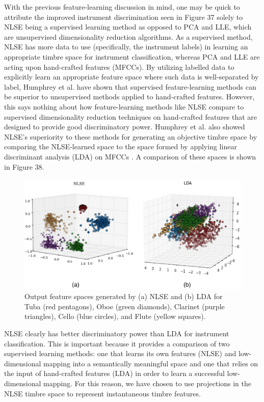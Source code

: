 \documentclass[12pt]{report} 	%
\numberwithin{figure}{chapter}
\numberwithin{table}{chapter}
\numberwithin{equation}{chapter}
\begin{document}
\begin{flushleft}
With the previous feature-learning discussion in mind, one may be quick to attribute the improved instrument discrimination seen in Figure 37 solely to NLSE being a supervised learning method as opposed to PCA and LLE, which are unsupervised dimensionality reduction algorithms. As a supervised method, NLSE has more data to use (specifically, the instrument labels) in learning an appropriate timbre space for instrument classification, whereas PCA and LLE are acting upon hand-crafted features (MFCCs). By utilizing labelled data to explicitly learn an appropriate feature space where such data is well-separated by label, Humphrey et al. have shown that supervised feature-learning methods can be superior to unsupervised methods applied to hand-crafted features. However, this says nothing about how feature-learning methods like NLSE compare to supervised dimensionality reduction techniques on hand-crafted features that are designed to provide good discriminatory power. Humphrey et al. also showed NLSE's superiority to these methods for generating an objective timbre space by comparing the NLSE-learned space to the space formed by applying linear discriminant analysis (LDA) on MFCCs \cite{humphrey2013feature}. A comparison of these spaces is shown in Figure 38.
\begin{figure}[h!]
\vspace{24pt}
\begin{center}
\includegraphics[width=\linewidth]{NLSECluster2}
\caption[NLSE vs. LDA instrument clusters]{Output feature spaces generated by (a) NLSE and (b) LDA for Tuba (red pentagons), Oboe (green diamonds), Clarinet (purple triangles), Cello (blue circles), and Flute (yellow squares).}
\end{center}
\vspace{6pt}
\end{figure}

NLSE clearly has better discriminatory power than LDA for instrument classification. This is important because it provides a comparison of two supervised learning methods: one that learns its own features (NLSE) and low-dimensional mapping into a semantically meaningful space and one that relies on the input of hand-crafted features (LDA) in order to learn a successful low-dimensional mapping. For this reason, we have chosen to use projections in the NLSE timbre space to represent instantaneous timbre features.


\end{flushleft}
\end{document}
